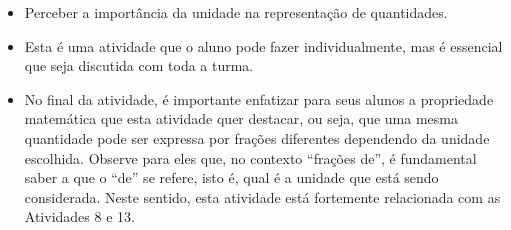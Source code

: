 \begin{multicols}{2}
\begin{objetivos}{}{}
\begin{itemize} %
    \item       Perceber a importância da unidade na representação de quantidades.
\end{itemize} %

\end{objetivos}

\begin{orientacoes}
\begin{itemize} %
    \item       Esta é uma atividade que o aluno pode fazer individualmente, mas é essencial que seja discutida com toda a turma.
    \item       No final da atividade, é importante enfatizar para seus alunos a propriedade matemática que esta atividade quer destacar, ou seja, que uma mesma quantidade pode ser expressa por frações diferentes dependendo da unidade escolhida. Observe para eles que, no contexto       ``frações de'', é fundamental saber a que o       ``de''     se refere, isto é, qual é a unidade que está sendo considerada. Neste sentido, esta atividade está fortemente relacionada com as Atividades 8 e 13.
\end{itemize} %


\end{orientacoes}


\end{multicols}
